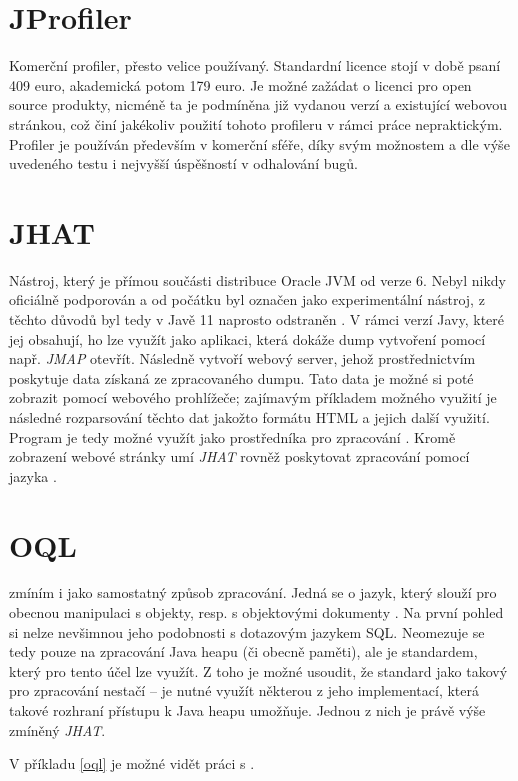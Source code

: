 \section{JProfiler}
Komerční profiler, přesto velice používaný. Standardní licence stojí v době psaní 409 euro, akademická potom 179 euro. Je možné zažádat o licenci pro open source produkty, nicméně ta je podmíněna již vydanou verzí a existující webovou stránkou, což činí jakékoliv použití tohoto profileru v rámci práce nepraktickým. Profiler je používán především v komerční sféře, díky svým možnostem a dle výše uvedeného testu i nejvyšší úspěšností v odhalování bugů.

\section{JHAT}
Nástroj, který je přímou součásti distribuce Oracle JVM od verze 6. Nebyl nikdy oficiálně podporován a od počátku byl označen jako experimentální nástroj, z těchto důvodů byl tedy v Javě 11 naprosto odstraněn \cite{jep241}\cite{java11migration}. V rámci verzí Javy, které jej obsahují, ho lze využít jako  aplikaci, která dokáže dump vytvoření pomocí např. \textit{JMAP} otevřít. Následně vytvoří webový server, jehož prostřednictvím poskytuje data získaná ze zpracovaného dumpu. Tato data je možné si poté zobrazit pomocí webového prohlížeče; zajímavým příkladem možného využití je následné rozparsování těchto dat jakožto formátu HTML a jejich další využití. Program je tedy možné využít jako prostředníka pro zpracování \cite{jhat}. Kromě  zobrazení webové stránky umí \textit{JHAT} rovněž poskytovat zpracování pomocí jazyka .

\section{OQL}
 zmíním i jako samostatný způsob zpracování. Jedná se o jazyk, který slouží pro obecnou manipulaci s objekty, resp. s objektovými dokumenty \cite{odmgoql}\cite{oql}. Na první pohled si nelze nevšimnou jeho podobnosti s dotazovým jazykem SQL. Neomezuje se tedy pouze na zpracování Java heapu (či obecně paměti), ale je standardem, který pro tento účel lze využít. Z toho je možné usoudit, že standard jako takový pro zpracování nestačí -- je nutné využít některou z jeho implementací, která takové rozhraní přístupu k Java heapu umožňuje. Jednou z nich je právě výše zmíněný \textit{JHAT}.

V příkladu \ref{oql} je možné vidět práci s .

